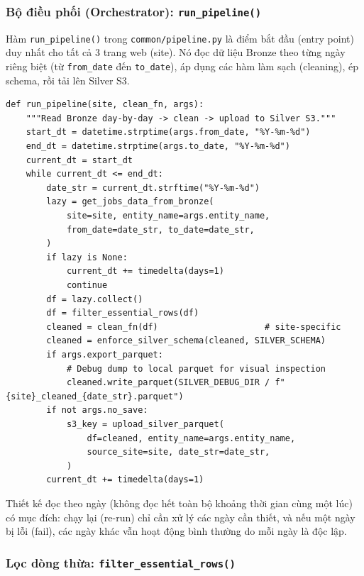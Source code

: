 \subsubsection{Bộ điều phối (Orchestrator): \texttt{run\_pipeline()}}

Hàm \texttt{run\_pipeline()} trong \texttt{common/pipeline.py} là điểm
bắt đầu (entry point) duy nhất cho tất cả 3 trang web (site). Nó đọc dữ liệu Bronze theo từng ngày riêng biệt
(từ \texttt{from\_date} đến \texttt{to\_date}), áp dụng các hàm làm sạch (cleaning), ép schema,
rồi tải lên Silver S3.

\begin{lstlisting}[style=pystyle, caption={Vòng lặp điều phối đọc theo ngày}, label={lst:run-pipeline}]
def run_pipeline(site, clean_fn, args):
    """Read Bronze day-by-day -> clean -> upload to Silver S3."""
    start_dt = datetime.strptime(args.from_date, "%Y-%m-%d")
    end_dt = datetime.strptime(args.to_date, "%Y-%m-%d")
    current_dt = start_dt
    while current_dt <= end_dt:
        date_str = current_dt.strftime("%Y-%m-%d")
        lazy = get_jobs_data_from_bronze(
            site=site, entity_name=args.entity_name,
            from_date=date_str, to_date=date_str,
        )
        if lazy is None:
            current_dt += timedelta(days=1)
            continue
        df = lazy.collect()
        df = filter_essential_rows(df)
        cleaned = clean_fn(df)                     # site-specific
        cleaned = enforce_silver_schema(cleaned, SILVER_SCHEMA)
        if args.export_parquet:
            # Debug dump to local parquet for visual inspection
            cleaned.write_parquet(SILVER_DEBUG_DIR / f"{site}_cleaned_{date_str}.parquet")
        if not args.no_save:
            s3_key = upload_silver_parquet(
                df=cleaned, entity_name=args.entity_name,
                source_site=site, date_str=date_str,
            )
        current_dt += timedelta(days=1)
\end{lstlisting}

Thiết kế đọc theo ngày (không đọc hết toàn bộ khoảng thời gian cùng một lúc) có mục đích:
chạy lại (re-run) chỉ cần xử lý các ngày cần thiết, và nếu một ngày bị lỗi (fail),
các ngày khác vẫn hoạt động bình thường do mỗi ngày là độc lập.

\subsubsection{Lọc dòng thừa: \texttt{filter\_essential\_rows()}}


